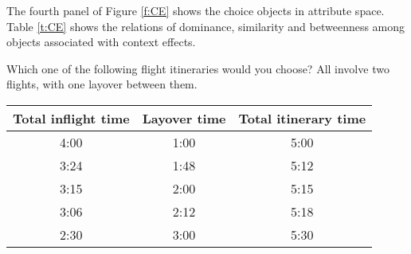 The fourth panel of Figure \ref{f:CE} shows the choice objects in attribute space.
Table \ref{t:CE} shows the relations of dominance, similarity and betweenness among objects associated with context effects.

\begin{tcolorbox}
Which one of the following flight itineraries would you choose?
All involve two flights, with one layover between them.

\begin{tabular}{ccc}
\hline
Total inflight time & Layover time & Total itinerary time \\ \hline
4:00 & 1:00 & 5:00 \\ 
3:24 & 1:48 & 5:12 \\ 
3:15 & 2:00 & 5:15 \\ 
3:06 & 2:12 & 5:18 \\ 
2:30 & 3:00 & 5:30 \\ \hline
\end{tabular}
\end{tcolorbox}
